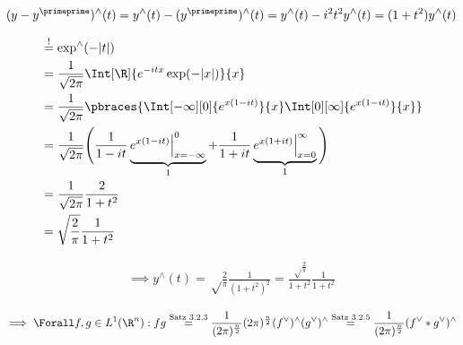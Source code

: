 \begin{solution}

\phantom{}


\begin{align*}
    (y - y^\primeprime)^\wedge(t)
    =
    y^\wedge(t) - (y^\primeprime)^\wedge(t)
    =
    y^\wedge(t) - i^2 t^2 y^\wedge(t)
    =
    (1 + t^2) y^\wedge(t)
\end{align*}

\begin{align*}
    & \stackrel{!}{=}
    \exp^\wedge(-|t|) \\
    & =
    \frac{1}{\sqrt{2 \pi}}
    \Int[\R]
    {
        e^{- i t x}
        \exp(-|x|)
    }{x} \\
    & =
    \frac{1}{\sqrt{2 \pi}}
    \pbraces
    {
        \Int[-\infty][0]
        {
            e^{x (1 - i t)}
        }{x}
        \Int[0][\infty]
        {
            e^{x (1 - i t)}
        }{x}
    } \\
    & =
    \frac{1}{\sqrt{2 \pi}}
    \Bigg (
        \frac{1}{1 - i t}
        \underbrace
        {
            e^{x (1 - it)} \Big |_{x = -\infty}^0    
        }_1
        +
        \frac{1}{1 + i t}
        \underbrace
        {
            e^{x (1 + it)} \Big |_{x=0}^\infty
        }_1
    \Bigg ) \\
    & =
    \frac{1}{\sqrt{2 \pi}}
    \frac{2}{1 + t^2} \\
    & =
    \sqrt \frac{2}{\pi}
    \frac{1}{1 + t^2}
\end{align*}

\begin{align*}
    \implies
    y^\wedge(t)
    =
    \sqrt \frac{2}{\pi}
    \frac{1}{(1 + t^2)^2}
    =
    \frac
    {
        \sqrt \frac{2}{\pi}
    }{
        1 + t^2
    }
    \frac{1}{1 + t^2}
\end{align*}


\begin{align*}
    \implies
    \Forall f, g \in L^1(\R^n):
    f g
    \stackrel
    {
        \text{Satz 3.2.3}
    }{=}
    \frac{1}
    {
        (2 \pi)^\frac{n}{2}
    }
    (2 \pi)^\frac{n}{2}
    (f^\vee)^\wedge (g^\vee)^\wedge
    \stackrel
    {
        \text{Satz 3.2.5}
    }{=}
    \frac{1}
    {
        (2 \pi)^\frac{n}{2}
    }
    (f^\vee \ast g^\vee)^\wedge
\end{align*}


\end{solution}
